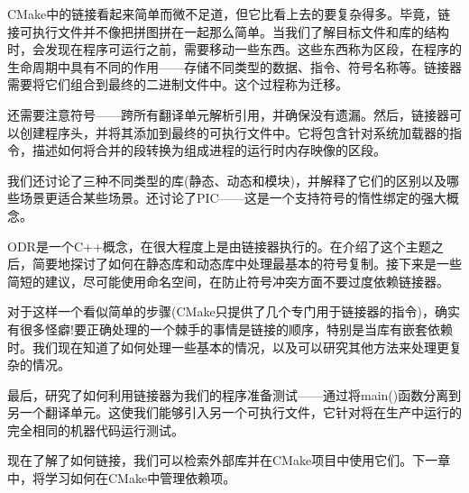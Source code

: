 CMake中的链接看起来简单而微不足道，但它比看上去的要复杂得多。毕竟，链接可执行文件并不像把拼图拼在一起那么简单。当我们了解目标文件和库的结构时，会发现在程序可运行之前，需要移动一些东西。这些东西称为区段，在程序的生命周期中具有不同的作用——存储不同类型的数据、指令、符号名称等。链接器需要将它们组合到最终的二进制文件中。这个过程称为迁移。

还需要注意符号——跨所有翻译单元解析引用，并确保没有遗漏。然后，链接器可以创建程序头，并将其添加到最终的可执行文件中。它将包含针对系统加载器的指令，描述如何将合并的段转换为组成进程的运行时内存映像的区段。

我们还讨论了三种不同类型的库(静态、动态和模块)，并解释了它们的区别以及哪些场景更适合某些场景。还讨论了PIC——这是一个支持符号的惰性绑定的强大概念。

ODR是一个C++概念，在很大程度上是由链接器执行的。在介绍了这个主题之后，简要地探讨了如何在静态库和动态库中处理最基本的符号复制。接下来是一些简短的建议，尽可能使用命名空间，在防止符号冲突方面不要过度依赖链接器。

对于这样一个看似简单的步骤(CMake只提供了几个专门用于链接器的指令)，确实有很多怪癖!要正确处理的一个棘手的事情是链接的顺序，特别是当库有嵌套依赖时。我们现在知道了如何处理一些基本的情况，以及可以研究其他方法来处理更复杂的情况。

最后，研究了如何利用链接器为我们的程序准备测试——通过将main()函数分离到另一个翻译单元。这使我们能够引入另一个可执行文件，它针对将在生产中运行的完全相同的机器代码运行测试。

现在了解了如何链接，我们可以检索外部库并在CMake项目中使用它们。下一章中，将学习如何在CMake中管理依赖项。
